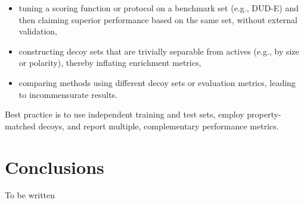 \documentclass[12pt,a4paper]{article}
\begin{document}
\begin{itemize}
  \item tuning a scoring function or protocol on a benchmark set (e.g., DUD-E) and then claiming superior performance based on the same set, without external validation,\cite{CH8_DUD-E2012}
  \item constructing decoy sets that are trivially separable from actives (e.g., by size or polarity), thereby inflating enrichment metrics,
  \item comparing methods using different decoy sets or evaluation metrics, leading to incommensurate results.
\end{itemize}

Best practice is to use independent training and test sets, employ property-matched decoys, and report multiple, complementary performance metrics.

\section{Conclusions}

To be written





\end{document}
